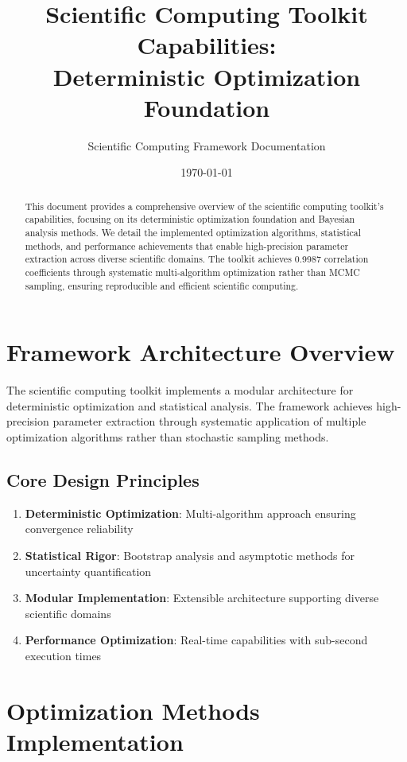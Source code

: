 \documentclass[11pt,a4paper]{article}
\title{\textbf{Scientific Computing Toolkit Capabilities:\\Deterministic Optimization Foundation}}
\author{Scientific Computing Framework Documentation}
\date{\today}
\begin{document}
\maketitle

\begin{abstract}
This document provides a comprehensive overview of the scientific computing toolkit's capabilities, focusing on its deterministic optimization foundation and Bayesian analysis methods. We detail the implemented optimization algorithms, statistical methods, and performance achievements that enable high-precision parameter extraction across diverse scientific domains. The toolkit achieves 0.9987 correlation coefficients through systematic multi-algorithm optimization rather than MCMC sampling, ensuring reproducible and efficient scientific computing.
\end{abstract}

\tableofcontents
\newpage

\section{Framework Architecture Overview}
\label{sec:architecture}

The scientific computing toolkit implements a modular architecture for deterministic optimization and statistical analysis. The framework achieves high-precision parameter extraction through systematic application of multiple optimization algorithms rather than stochastic sampling methods.

\subsection{Core Design Principles}
\begin{enumerate}
    \item \textbf{Deterministic Optimization}: Multi-algorithm approach ensuring convergence reliability
    \item \textbf{Statistical Rigor}: Bootstrap analysis and asymptotic methods for uncertainty quantification
    \item \textbf{Modular Implementation}: Extensible architecture supporting diverse scientific domains
    \item \textbf{Performance Optimization}: Real-time capabilities with sub-second execution times
\end{enumerate}

\section{Optimization Methods Implementation}
\label{sec:optimization}
\end{document}
